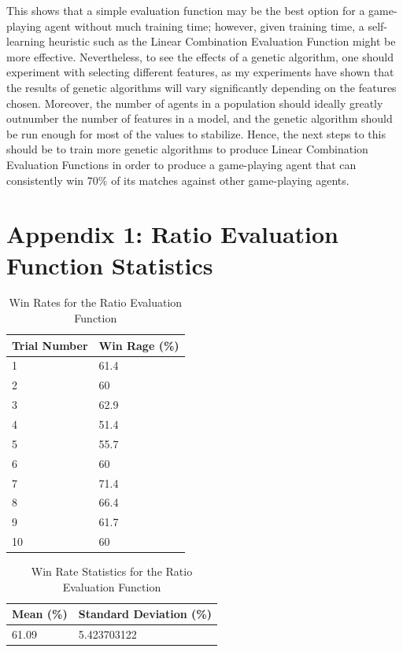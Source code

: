 \documentclass[12pt]{article}
\begin{document}
This shows that a simple evaluation function may be the best option for a game-playing agent without much training time; however, given training time, a self-learning heuristic such as the Linear Combination Evaluation Function might be more effective. Nevertheless, to see the effects of a genetic algorithm, one should experiment with selecting different features, as my experiments have shown that the results of genetic algorithms will vary significantly depending on the features chosen. Moreover, the number of agents in a population should ideally greatly outnumber the number of features in a model, and the genetic algorithm should be run enough for most of the values to stabilize. Hence, the next steps to this should be to train more genetic algorithms to produce Linear Combination Evaluation Functions in order to produce a game-playing agent that can consistently win 70\% of its matches against other game-playing agents.

\newpage
\section{Appendix 1: Ratio Evaluation Function Statistics}
\begin{table}[h]
\centering
\caption{Win Rates for the Ratio Evaluation Function}
\label{ratio-eval}
\begin{tabular}{@{}|l|l|@{}}
\toprule
Trial Number & Win Rage (\%) \\ \midrule
1            & 61.4          \\ \midrule
2            & 60            \\ \midrule
3            & 62.9          \\ \midrule
4            & 51.4          \\ \midrule
5            & 55.7          \\ \midrule
6            & 60            \\ \midrule
7            & 71.4          \\ \midrule
8            & 66.4          \\ \midrule
9            & 61.7          \\ \midrule
10           & 60            \\ \bottomrule
\end{tabular}
\end{table}

\begin{table}[h]
\centering
\caption{Win Rate Statistics for the Ratio Evaluation Function}
\label{ratio-stats}
\begin{tabular}{@{}|l|l|@{}}
\toprule
Mean (\%)& Standard Deviation (\%) \\ \midrule
61.09           & 5.423703122
\\ \bottomrule
\end{tabular}
\end{table}
\end{document}
